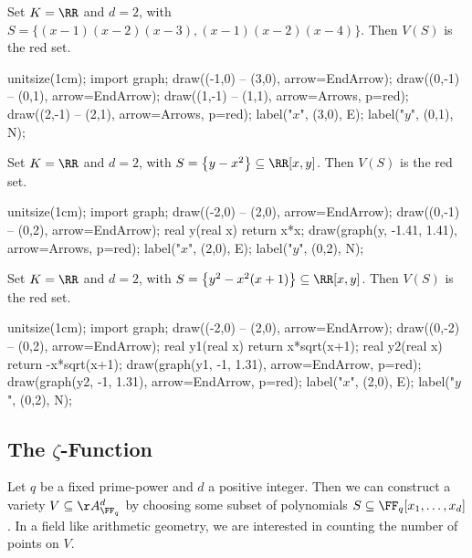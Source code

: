 \documentclass{article}
\begin{document}
\begin{example}
	Set $K=\RR$ and $d=2$, with $S=\{(x-1)(x-2)(x-3),(x-1)(x-2)(x-4)\}$. Then $V(S)$ is the red set.
	\begin{center}
		\begin{asy}
			unitsize(1cm);
			import graph;
			draw((-1,0) -- (3,0), arrow=EndArrow);
			draw((0,-1) -- (0,1), arrow=EndArrow);
			draw((1,-1) -- (1,1), arrow=Arrows, p=red);
			draw((2,-1) -- (2,1), arrow=Arrows, p=red);
			label("$x$", (3,0), E);
			label("$y$", (0,1), N);
		\end{asy}
	\end{center}
\end{example}
\begin{example}
	Set $K=\RR$ and $d=2$, with $S=\left\{y-x^2\right\}\subseteq\RR[x,y]$. Then $V(S)$ is the red set.
	\begin{center}
		\begin{asy}
			unitsize(1cm);
			import graph;
			draw((-2,0) -- (2,0), arrow=EndArrow);
			draw((0,-1) -- (0,2), arrow=EndArrow);
			real y(real x)
			{
				return x*x;
			}
			draw(graph(y, -1.41, 1.41), arrow=Arrows, p=red);
			label("$x$", (2,0), E);
			label("$y$", (0,2), N);
		\end{asy}
	\end{center}
\end{example}
\begin{example}
	Set $K=\RR$ and $d=2$, with $S=\left\{y^2-x^2(x+1)\right\}\subseteq\RR[x,y]$. Then $V(S)$ is the red set.
	\begin{center}
		\begin{asy}
			unitsize(1cm);
			import graph;
			draw((-2,0) -- (2,0), arrow=EndArrow);
			draw((0,-2) -- (0,2), arrow=EndArrow);
			real y1(real x)
			{
				return x*sqrt(x+1);
			}
			real y2(real x)
			{
				return -x*sqrt(x+1);
			}
			draw(graph(y1, -1, 1.31), arrow=EndArrow, p=red);
			draw(graph(y2, -1, 1.31), arrow=EndArrow, p=red);
			label("$x$", (2,0), E);
			label("$y$", (0,2), N);
		\end{asy}
	\end{center}
\end{example}

\subsection{The \texorpdfstring{$\zeta$}{ Z}-Function} \label{subsec:constructzeta}
Let $q$ be a fixed prime-power and $d$ a positive integer. Then we can construct a variety $V\subseteq\AA_{\FF_q}^d$ by choosing some subset of polynomials $S\subseteq\FF_q[x_1,\ldots,x_d]$. In a field like arithmetic geometry, we are interested in counting the number of points on $V$.
\end{document}
